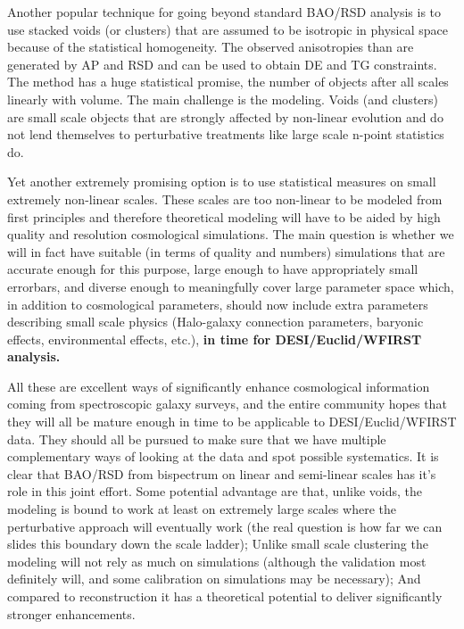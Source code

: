 Another popular technique for going beyond standard BAO/RSD analysis is to use
stacked voids (or clusters) that are assumed to be isotropic in physical space
because of the statistical homogeneity. The observed anisotropies than are
generated by AP and RSD and can be used to obtain DE and TG constraints. The
method has a huge statistical promise, the number of objects after all scales
linearly with volume. The main challenge is the modeling. Voids (and clusters)
are small scale objects that are strongly affected by non-linear evolution and
do not lend themselves to perturbative treatments like large scale n-point
statistics do.

Yet another extremely promising option is to use statistical measures on small
extremely non-linear scales. These scales are too non-linear to be modeled from
first principles and therefore theoretical modeling will have to be aided by
high quality and resolution cosmological simulations. The main question is
whether we will in fact have suitable (in terms of quality and numbers)
simulations that are accurate enough for this purpose, large enough to have
appropriately small errorbars, and diverse enough to meaningfully cover large
parameter space which, in addition to cosmological parameters, should now
include extra parameters describing small scale physics (Halo-galaxy connection
parameters, baryonic effects, environmental effects, etc.), \textbf{in time for
DESI/Euclid/WFIRST analysis.}

All these are excellent ways of significantly enhance cosmological information
coming from spectroscopic galaxy surveys, and the entire community hopes that
they will all be mature enough in time to be applicable to DESI/Euclid/WFIRST
data.  They should all be pursued to make sure that we have multiple
complementary ways of looking at the data and spot possible systematics. It is
clear that BAO/RSD from bispectrum on linear and semi-linear scales has it's
role in this joint effort. Some potential advantage are that, unlike voids, the
modeling is bound to work at least on extremely large scales where the
perturbative approach will eventually work (the real question is how far we can
slides this boundary down the scale ladder); Unlike small scale clustering the
modeling will not rely as much on simulations (although the validation most
definitely will, and some calibration on simulations may be necessary); And
compared to reconstruction it has a theoretical potential to deliver
significantly stronger enhancements.


